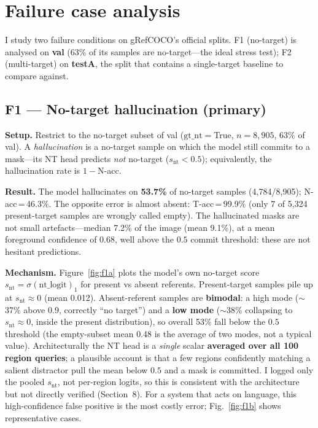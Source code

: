 \documentclass[11pt]{article}
\begin{document}
\section{Failure case analysis}
I study two failure conditions on gRefCOCO's official splits.
F1 (no-target) is analysed on \textbf{val} (63\% of its samples are no-target---the
ideal stress test); F2 (multi-target) on \textbf{testA}, the split that contains a single-target
baseline to compare against.

\subsection{F1 --- No-target hallucination (primary)}
\textbf{Setup.} Restrict to the no-target subset of val ($\mathrm{gt\_nt}{=}$True, $n{=}8{,}905$, 63\%
of val). A \emph{hallucination} is a no-target sample on which the model still commits to a mask---its
NT head predicts \emph{not} no-target ($s_\mathrm{nt}<0.5$); equivalently, the hallucination rate is
$1-$N-acc.

\smallskip\noindent\textbf{Result.} The model hallucinates on \textbf{53.7\%} of no-target samples
(4{,}784/8{,}905); N-acc\,=\,46.3\%. The opposite error is almost absent: T-acc\,=\,99.9\% (only 7 of
5{,}324 present-target samples are wrongly called empty). The hallucinated masks are not small
artefacts---median 7.2\% of the image (mean 9.1\%), at a mean foreground confidence of 0.68, well
above the $0.5$ commit threshold: these are not hesitant predictions.

\smallskip\noindent\textbf{Mechanism.} Figure~\ref{fig:f1a} plots the model's own no-target score
$s_\mathrm{nt}=\sigma(\mathrm{nt\_logit})_1$ for present vs absent referents. Present-target samples
pile up at $s_\mathrm{nt}\!\approx\!0$ (mean 0.012). Absent-referent samples are \textbf{bimodal}: a
high mode ($\sim$37\% above 0.9, correctly ``no target'') and a \textbf{low mode} ($\sim$38\%
collapsing to $s_\mathrm{nt}\!\approx\!0$, inside the present distribution), so overall 53\% fall below
the $0.5$ threshold (the empty-subset mean 0.48 is the average of two modes, not a typical value).
Architecturally the NT head is a \emph{single} scalar \textbf{averaged over all 100 region queries};
a plausible account is that a few regions confidently matching a salient distractor pull the mean
below $0.5$ and a mask is committed. I logged only the pooled $s_\mathrm{nt}$, not per-region logits,
so this is consistent with the architecture but not directly verified (Section~8). For a system that
acts on language, this high-confidence false positive is the most costly error; Fig.~\ref{fig:f1b}
shows representative cases.
\end{document}
